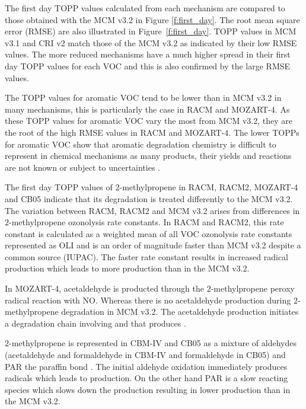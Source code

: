 The first day TOPP values calculated from each mechanism are compared to those obtained with the MCM v3.{2} in Figure \ref{f:first_day}. 
The root mean square error (RMSE) are also illustrated in \mbox{Figure \ref{f:first_day}}.
TOPP values in MCM v3.1 and CRI v2 match those of the MCM v3.2 as indicated by their low RMSE values.
The more reduced mechanisms have a much higher spread in their first day TOPP values for each VOC and this is also confirmed by the large RMSE values.

The TOPP values for aromatic VOC tend to be lower than in MCM v3.2 in many mechanisms, this is particularly the case in RACM and  MOZART-4.
As these TOPP values for aromatic VOC vary the most from MCM v3.2, they are the root of the high RMSE values in RACM and  MOZART-4.
The lower TOPPs for aromatic VOC show that aromatic degradation chemistry is difficult to represent in chemical mechanisms as many products, their yields and reactions are not known or subject to uncertainties \citep{Vereecken:2012}.

The first day TOPP values of $2$-methylpropene in RACM, RACM2, MOZART-4 and CB05 indicate that its degradation is treated differently to the MCM v3.2. 
The variation between RACM, RACM2 and MCM v3.2 arises from differences in $2$-methylpropene ozonolysis rate constants.
In RACM and RACM2, this rate constant is calculated as a weighted mean of all VOC ozonolysis rate constants represented as OLI \citep{Stockwell:1997, Goliff:2013} and is an order of magnitude faster than MCM v3.2 despite a common source (IUPAC).
The faster rate constant results in increased radical production which leads to more  production than in the MCM v3.2.

In MOZART-4, acetaldehyde is producted through the $2$-methylpropene peroxy radical reaction with NO.
Whereas there is no acetaldehyde production during $2$-methylpropene degradation in MCM v3.2.
The acetaldehyde production initiates a degradation chain involving  and  that produces .

$2$-methylpropene is represented in CBM-IV and CB05 as a mixture of aldehydes (acetaldehyde and formaldehyde in CBM-IV and formaldehyde in CB05) and PAR the paraffin  bond \citep{Gery:1989, Yarwood:2005}. 
The initial aldehyde oxidation immediately produces radicals which leads to  production.
On the other hand PAR is a slow reacting species which slows down the  production resulting in lower  production than in the MCM v3.2.

